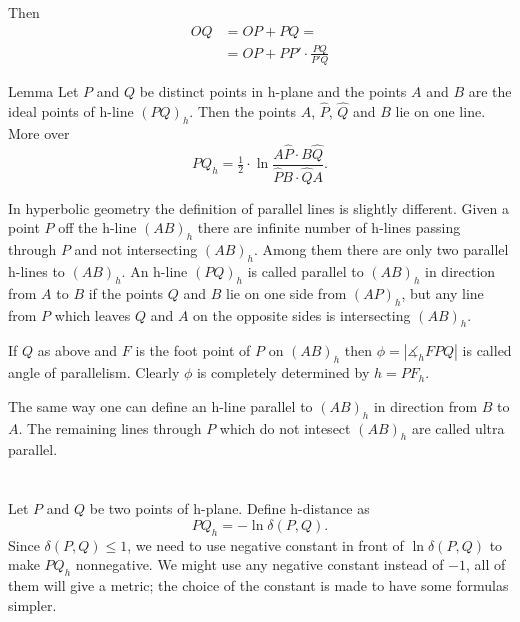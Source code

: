 Then 
\begin{align*}
OQ&=OP+PQ=
\\
&=OP+PP'\cdot \frac{PQ}{P'Q}
\end{align*}


\qeds



\begin{thm}{Lemma}
Let $P$ and $Q$ be distinct points in h-plane and the points $A$ and $B$ are the ideal points of h-line $(PQ)_h$.
Then the points $A$, $\hat P$, $\hat Q$ and $B$ lie on one line.
More over 
$$PQ_h=\tfrac12\cdot\ln\frac{A\hat P\cdot B\hat Q}{\hat PB\cdot \hat QA}.$$
\end{thm}

 
 
 
 
 
 
 
 
 
 In hyperbolic geometry the definition of parallel lines is slightly different.
Given a point $P$ off the h-line $(AB)_h$ 
there are infinite number of h-lines passing through $P$ and not intersecting $(AB)_h$. 
Among them there are only two parallel h-lines to $(AB)_h$. 
An h-line $(PQ)_h$ is called parallel to $(AB)_h$
in direction from $A$ to $B$ if the points $Q$ and $B$ lie on one side from $(AP)_h$, but any line from $P$ which leaves $Q$ and $A$ on the opposite sides is intersecting $(AB)_h$.

If $Q$ as above and $F$ is the foot point of $P$ on $(AB)_h$ then $\phi=|\measuredangle_h FPQ|$ is called angle of parallelism.
Clearly $\phi$ is completely determined by $h=PF_h$.

The same way one can define an h-line parallel to $(AB)_h$
in direction from $B$ to $A$.
The remaining lines through $P$ which do not intesect $(AB)_h$ are called ultra parallel.












\section{}

Let $P$ and $Q$ be two points of h-plane.
Define h-distance  as 
$$PQ_h=-\ln\delta(P,Q).$$
Since $\delta(P,Q)\le 1$, we need to use negative constant in front of $\ln\delta(P,Q)$ to make $PQ_h$ nonnegative.
We might use any negative constant instead of $-1$, all of them will give a metric; the choice of the constant is made to have some formulas simpler.


